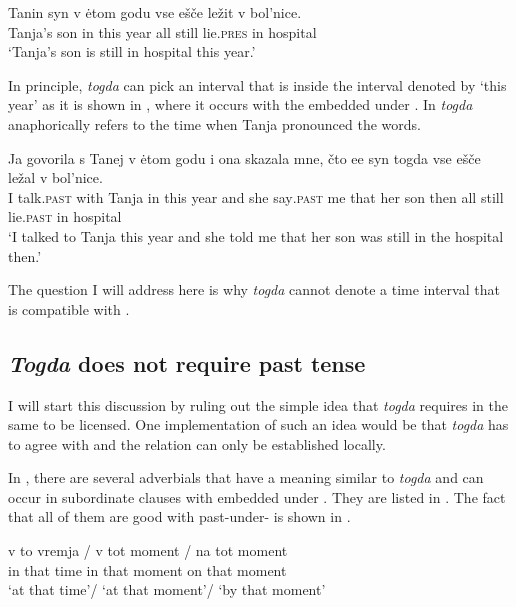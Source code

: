 \documentclass[output=paper,modfonts,newtxmath,hidelinks]{langscibook}
\begin{document}
\ea \label{20:ex14}
\gll Tanin syn v ėtom godu vse ešče ležit v bol’nice.\\
     Tanja’s son in this year all still lie\textsc{.pres} in hospital\\
\glt `Tanja’s son is still in hospital this year.'
\z

\noindent In principle, \textit{togda} can pick an interval that is inside the interval denoted by ‘this year’ as it is shown in , where it occurs with the  embedded under . In  \textit{togda} anaphorically refers to the time when Tanja pronounced the words.

\ea \label{20:ex15}
\gll Ja govorila s Tanej v ėtom godu i ona skazala mne, čto ee syn togda vse ešče ležal v bol’nice.\\
     I talk.\textsc{past} with Tanja in this year and she say\textsc{.past} me that her son then all still lie\textsc{.past} in hospital\\
\glt `I talked to Tanja this year and she told me that her son was still in the hospital then.'
\z

\noindent The question I will address here is why \textit{togda} cannot denote a time interval that is compatible with .

\subsection{\textit{Togda} does not require past tense}\label{20:s2.2}

I will start this discussion by ruling out the simple idea that  \textit{togda} requires  in the same  to be licensed. One implementation of such an idea would be that \textit{togda} has to agree with  and the  relation can only be established locally.

In , there are several adverbials that have a meaning similar to \textit{togda} and can occur in subordinate clauses with  embedded under . They are listed in . The fact that all of them are good with past-under- is shown in .

\ea \label{20:ex16}
\gll v to vremja / v tot moment / na tot moment\\
     in that time {} in that moment {} on that moment\\
\glt `at that time'/ `at that moment'/ `by that moment'
\z
\end{document}
